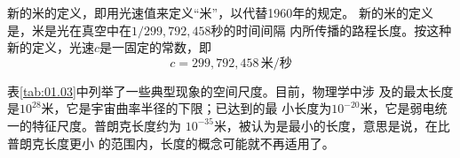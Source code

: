 \noindent 新的米的定义，即用光速值来定义“米”，以代替1960年的规定。
新的米的定义是，米是光在真空中在$ 1/299,792,458 $秒的时间间隔
内所传播的路程长度。按这种新的定义，光速$ c $是一固定的常数，即
\begin{equation*}
 c = 299,792,458 \, \text{米/秒}
\end{equation*}

表\ref{tab:01.03}中列举了一些典型现象的空间尺度。目前，物理学中涉
及的最太长度是$10^{28}$米，它是宇宙曲率半径的下限；已达到的最
小长度为$10^{-20}$米，它是弱电统一的特征尺度。普朗克长度约为
$10^{-35}$米，被认为是最小的长度，意思是说，在比普朗克长度更小
的范围内，长度的概念可能就不再适用了。
